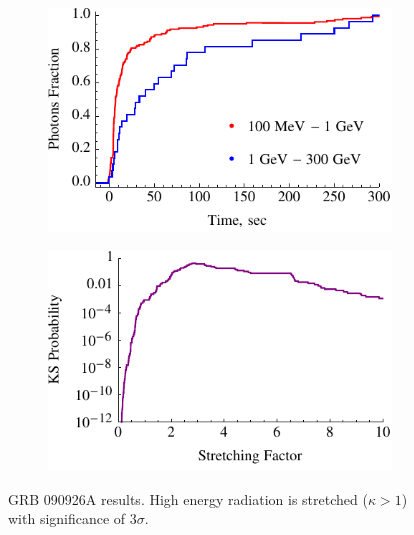 \documentclass{article}
\begin{document}
\begin{figure}
        \centering
        \begin{subfigure}{0.49\textwidth}
                \includegraphics[width=\textwidth]{lightCurve090926A}
                \label{fig:lightCurve090926A}
        \end{subfigure}
        \begin{subfigure}{0.49\textwidth}
                \includegraphics[width=\textwidth]{probabilities090926A}
                \label{fig:probabilities090926A}
        \end{subfigure}
        \caption{GRB 090926A results. High energy radiation is stretched ($\kappa > 1$) with significance of $3\sigma$.}
        \label{fig:grb090926A}
\end{figure}
\end{document}
